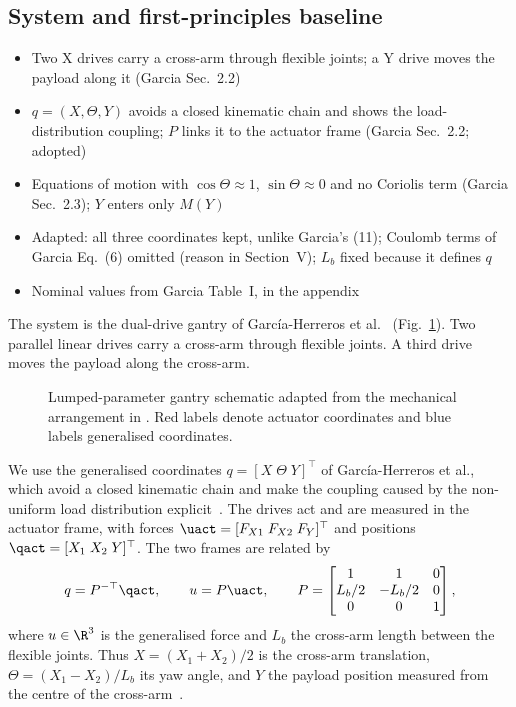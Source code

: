 \subsection{System and first-principles baseline}\label{sec:system}
\ifdraft
\begin{itemize}
\item Two X drives carry a cross-arm through flexible joints; a Y drive moves the payload along it (Garcia Sec.~2.2)
\item $q=(X,\Theta,Y)$ avoids a closed kinematic chain and shows the load-distribution coupling; $P$ links it to the actuator frame (Garcia Sec.~2.2; adopted)
\item Equations of motion with $\cos\Theta\approx1$, $\sin\Theta\approx0$ and no Coriolis term (Garcia Sec.~2.3); $Y$ enters only $M(Y)$
\item Adapted: all three coordinates kept, unlike Garcia's (11); Coulomb terms of Garcia Eq.~(6) omitted (reason in Section~V); $L_b$ fixed because it defines $q$
\item Nominal values from Garcia Table~I, in the appendix
\end{itemize}
\fi
The system is the dual-drive gantry of Garc\'ia-Herreros et
al.~\cite{garcia2013model} (Fig.~\ref{fig:gantry_system}).
Two parallel linear drives carry a cross-arm through flexible joints.
A third drive moves the payload along the cross-arm.
\begin{figure}[b]
  \centering
  \def\gantryabsorber{0}%
  
  \caption{Lumped-parameter gantry schematic adapted from the mechanical
  arrangement in \cite{garcia2013model}. Red labels denote actuator coordinates
  and blue labels generalised coordinates.}
  \label{fig:gantry_system}
\end{figure}

We use the generalised coordinates $q=[X\;\Theta\;Y]^\top$ of
Garc\'ia-Herreros et al., which avoid a closed kinematic chain and make the
coupling caused by the non-uniform load distribution
explicit~\cite[Sec.~2.2]{garcia2013model}.
The drives act and are measured in the actuator frame, with forces
$\uact=[F_{X1}\;F_{X2}\;F_Y]^\top$ and positions
$\qact=[X_1\;X_2\;Y]^\top$.
The two frames are related by
\begin{equation}
  q = P^{-\top}\qact,
  \qquad
  u = P\uact,
  \qquad
  P =
  \begin{bmatrix}
    1 & 1 & 0\\
    L_b/2 & -L_b/2 & 0\\
    0 & 0 & 1
  \end{bmatrix},
\label{eq:Ptransform}
\end{equation}
where $u\in\R^3$ is the generalised force and $L_b$ the cross-arm length
between the flexible joints.
Thus $X=(X_1+X_2)/2$ is the cross-arm translation, $\Theta=(X_1-X_2)/L_b$ its
yaw angle, and $Y$ the payload position measured from the centre of the
cross-arm~\cite[Sec.~2.2]{garcia2013model}.


